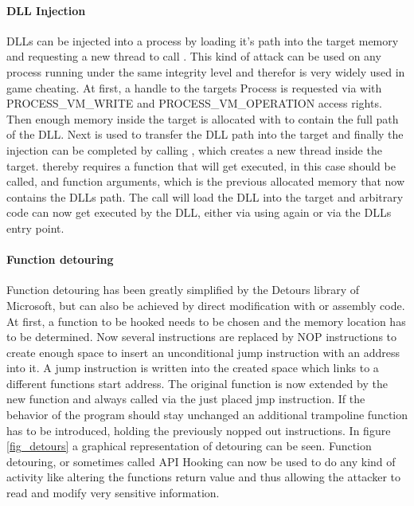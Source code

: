 \paragraph{ DLL Injection}
DLLs can be injected into a process by loading it's path into the target memory and requesting a new thread to call . This kind of attack can be used on any process running under the same integrity level and therefor is very widely used in game cheating. At first, a handle to the targets Process is requested via  with PROCESS\_VM\_WRITE and PROCESS\_VM\_OPERATION access rights. Then enough memory inside the target is allocated with  to contain the full path of the DLL. Next  is used to transfer the DLL path into the target and finally the injection can be completed by calling , which creates a new thread inside the target.  thereby requires a function that will get executed, in this case  should be called, and function arguments, which is the previous allocated memory that now contains the DLLs path. The  call will load the DLL into the target and arbitrary code can now get executed by the DLL, either via using  again or via the DLLs entry point.
\paragraph{Function detouring}
Function detouring has been greatly simplified by the Detours\cite{msdetours} library of Microsoft, but can also be achieved by direct modification with  or assembly code. At first, a function to be hooked needs to be chosen and the memory location has to be determined. Now several instructions are replaced by NOP instructions to create enough space to insert an unconditional jump instruction with an address into it. A jump instruction is written into the created space which links to a different functions start address. The original function is now extended by the new function and always called via the just placed jmp instruction. If the behavior of the program should stay unchanged an additional trampoline function has to be introduced, holding the previously nopped out instructions. In figure \ref{fig_detours} a graphical representation of detouring can be seen. Function detouring, or sometimes called API Hooking can now be used to do any kind of activity like altering the functions return value and thus allowing the attacker to read and modify very sensitive information.

